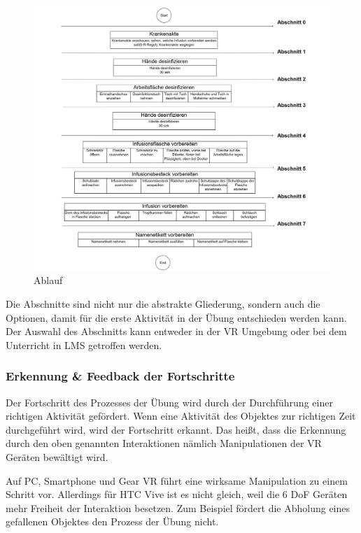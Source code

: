   \begin{figure}[ht]
  \begin{minipage}[t]{1\linewidth}
  \centering
  \includegraphics[width=\textwidth]{images/infusion_vorbereitung_durchlauf.png}
  \caption[Skillslab WebVR]{Ablauf}
  \end{minipage}
  \end{figure}
  
  Die Abschnitte sind nicht nur die abstrakte Gliederung, sondern auch die Optionen, damit für die erste Aktivität in der Übung entschieden werden kann. Der Auswahl des Abschnitts kann entweder in der VR Umgebung oder bei dem Unterricht in LMS getroffen werden.
  
  \subsubsection{Erkennung \& Feedback der Fortschritte}
  Der Fortschritt des Prozesses der Übung wird durch der Durchführung einer richtigen Aktivität gefördert. Wenn eine Aktivität des Objektes zur richtigen Zeit durchgeführt wird, wird der Fortschritt erkannt. Das heißt, dass die Erkennung durch den oben genannten Interaktionen nämlich Manipulationen der VR Geräten bewältigt wird.
  
  Auf PC, Smartphone und Gear VR führt eine wirksame Manipulation zu einem Schritt vor. Allerdings für HTC Vive ist es nicht gleich, weil die 6 DoF Geräten mehr Freiheit der Interaktion besetzen. Zum Beispiel fördert die Abholung eines gefallenen Objektes den Prozess der Übung nicht. 
  
